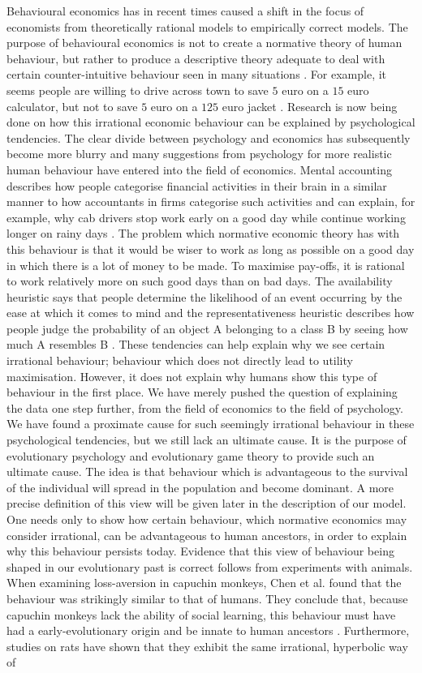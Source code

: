 \documentclass[a4paper,10pt]{article}
\numberwithin{equation}{section}
\begin{document}
Behavioural economics has in recent times caused a shift in the focus of economists from theoretically rational models to empirically correct models. The purpose of behavioural economics is not to create a normative theory of human behaviour, but rather to produce a descriptive theory adequate to deal with certain counter-intuitive behaviour seen in many situations \cite{Kahneman1990}. For example, it seems people are willing to drive across town to save $5$ euro on a $15$ euro calculator, but not to save $5$ euro on a $125$ euro jacket \cite{Kahneman1984}. Research is now being done on how this irrational economic behaviour can be explained by psychological tendencies. The clear divide between psychology and economics has subsequently become more blurry and many suggestions from psychology for more realistic human behaviour have entered into the field of economics. Mental accounting describes how people categorise financial activities in their brain in a similar manner to how accountants in firms categorise such activities and can explain, for example, why cab drivers stop work early on a good day while continue working longer on rainy days \cite{Wilkinson2008}. The problem which normative economic theory has with this behaviour is that it would be wiser to work as long as possible on a good day in which there is a lot of money to be made. To maximise pay-offs, it is rational to work relatively more on such good days than on bad days. The availability heuristic says that people determine the likelihood of an event occurring by the ease at which it comes to mind and the representativeness heuristic describes how people judge the probability of an object A belonging to a class B by seeing how much A resembles B \cite{Tversky1974}. These tendencies can help explain why we see certain irrational behaviour; behaviour which does not directly lead to utility maximisation. However, it does not explain why humans show this type of behaviour in the first place. We have merely pushed the question of explaining the data one step further, from the field of economics to the field of psychology. We have found a proximate cause for such seemingly irrational behaviour in these psychological tendencies, but we still lack an ultimate cause. It is the purpose of evolutionary psychology and evolutionary game theory to provide such an ultimate cause. The idea is that behaviour which is advantageous to the survival of the individual will spread in the population and become dominant. A more precise definition of this view will be given later in the description of our model. One needs only to show how certain behaviour, which normative economics may consider irrational, can be advantageous to human ancestors, in order to explain why this behaviour persists today. Evidence that this view of behaviour being shaped in our evolutionary past is correct follows from experiments with animals. When examining loss-aversion in capuchin monkeys, Chen et al. found that the behaviour was strikingly similar to that of humans. They conclude that, because capuchin monkeys lack the ability of social learning, this behaviour must have had a early-evolutionary origin and be innate to human ancestors \cite{Chen2006}. Furthermore, studies on rats have shown that they exhibit the same irrational, hyperbolic way of 
\end{document}
